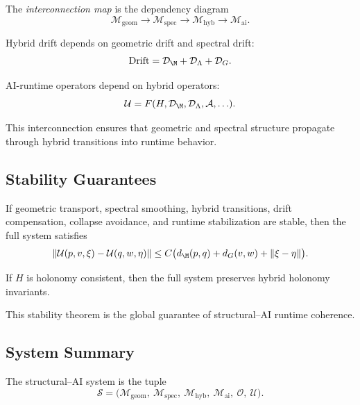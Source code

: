 \documentclass[11pt]{article}
\begin{document}
\begin{definition}
The \emph{interconnection map} is the dependency diagram
\[
\mathcal{M}_\mathrm{geom}
\longrightarrow
\mathcal{M}_\mathrm{spec}
\longrightarrow
\mathcal{M}_\mathrm{hyb}
\longrightarrow
\mathcal{M}_\mathrm{ai}.
\]
\end{definition}

\begin{lemma}
Hybrid drift depends on geometric drift and spectral drift:
\[
\mathrm{Drift}
= \mathcal{D}_\M + \mathcal{D}_\Lambda + \mathcal{D}_G.
\]
\end{lemma}

\begin{lemma}
AI-runtime operators depend on hybrid operators:
\[
\mathcal{U}
= F(H,\mathcal{D}_\M,\mathcal{D}_\Lambda,\mathcal{A},\ldots).
\]
\end{lemma}

\begin{remark}
This interconnection ensures that geometric and spectral structure
propagate through hybrid transitions into runtime behavior.
\end{remark}

\subsection{Stability Guarantees}

\begin{theorem}
If geometric transport, spectral smoothing, hybrid transitions, drift
compensation, collapse avoidance, and runtime stabilization are stable,
then the full system satisfies
\[
\| \mathcal{U}(p,v,\xi) - \mathcal{U}(q,w,\eta) \|
\le C \big( d_\M(p,q) + d_G(v,w) + \|\xi - \eta\| \big).
\]
\end{theorem}

\begin{lemma}
If $H$ is holonomy consistent, then the full system preserves hybrid
holonomy invariants.
\end{lemma}

\begin{remark}
This stability theorem is the global guarantee of structural--AI runtime
coherence.
\end{remark}

\subsection{System Summary}

\begin{definition}
The structural--AI system is the tuple
\[
\mathcal{S}
= \big(
\mathcal{M}_\mathrm{geom},\ 
\mathcal{M}_\mathrm{spec},\ 
\mathcal{M}_\mathrm{hyb},\ 
\mathcal{M}_\mathrm{ai},\ 
\mathcal{O},\ 
\mathcal{U}
\big).
\]
\end{definition}
\end{document}
